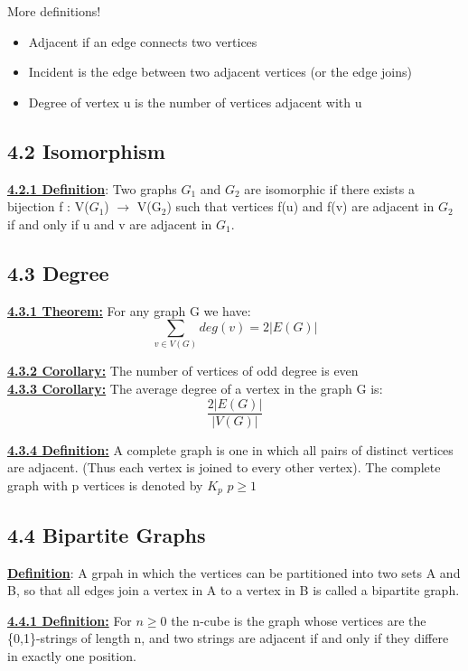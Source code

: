 \documentclass[12pt]{article}
\newcommand{\myt}[1]{\textbf{\underline{#1}}}
\begin{document}
	More definitions!\\
	\begin{itemize}
		\item Adjacent if an edge connects two vertices
		\item Incident is the edge between two adjacent vertices (or the edge joins)
		\item Degree of vertex u is the number of vertices adjacent with u
	\end{itemize}
	
	\subsection*{4.2 Isomorphism}
	\myt{4.2.1 Definition}: Two graphs $G_1$ and $G_2$ are isomorphic if there exists a bijection f : V($G_1$) $\rightarrow$ V(G$_2$) such that vertices f(u) and f(v) are adjacent in $G_2$ if and only if u and v are adjacent in $G_1$. 
	
	\subsection*{4.3 Degree}
	\myt{4.3.1 Theorem:} For any graph G we have:\\
	$$\sum_{v \in V(G)}deg(v) = 2|E(G)|$$
	
	\myt{4.3.2 Corollary:} The number of vertices of odd degree is even\\
	
	\myt{4.3.3 Corollary:} The average degree of a vertex in the graph G is:\\
	$$\frac{2|E(G)|}{|V(G)|}$$
	
	\myt{4.3.4 Definition:} A complete graph is one in which all pairs of distinct vertices are adjacent. (Thus each vertex is joined to every other vertex). The complete graph with p vertices is denoted by $K_p$ $p \geq 1$\\

	\subsection*{4.4 Bipartite Graphs}
	\myt{Definition}: A grpah in which the vertices can be partitioned into two sets A and B, so that all edges join a vertex in A to a vertex in B is called a bipartite graph.
	
	\myt{4.4.1 Definition:} For $n \geq 0$ the n-cube is the graph whose vertices are the \{0,1\}-strings of length n, and two strings are adjacent if and only if they differe in exactly one position.\\
	
\end{document}
